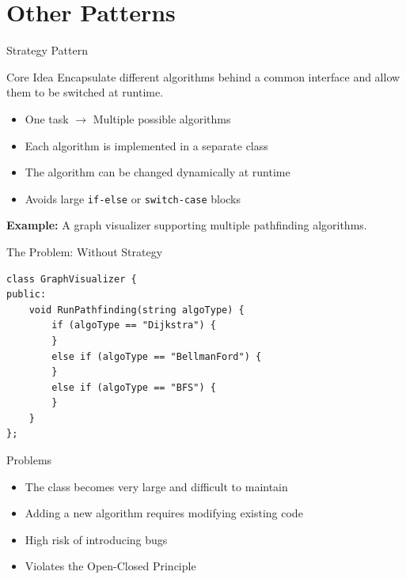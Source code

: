 \documentclass[aspectratio=169]{beamer}
\begin{document}
\section{Other Patterns}

\begin{frame}{Strategy Pattern}
    \begin{block}{Core Idea}
        Encapsulate different algorithms behind a common interface
        and allow them to be switched at runtime.
    \end{block}

    \begin{itemize}
        \item One task $\rightarrow$ Multiple possible algorithms
        \item Each algorithm is implemented in a separate class
        \item The algorithm can be changed dynamically at runtime
        \item Avoids large \texttt{if-else} or \texttt{switch-case} blocks
    \end{itemize}

    \textbf{Example:} A graph visualizer supporting multiple pathfinding algorithms.
\end{frame}

\begin{frame}[fragile]{The Problem: Without Strategy}

\begin{lstlisting}
class GraphVisualizer {
public:
    void RunPathfinding(string algoType) {
        if (algoType == "Dijkstra") {
        }
        else if (algoType == "BellmanFord") {
        }
        else if (algoType == "BFS") {
        }
    }
};
\end{lstlisting}

\begin{alertblock}{Problems}
    \begin{itemize}
        \item The class becomes very large and difficult to maintain
        \item Adding a new algorithm requires modifying existing code
        \item High risk of introducing bugs
        \item Violates the Open-Closed Principle
    \end{itemize}
\end{alertblock}

\end{frame}
\end{document}
